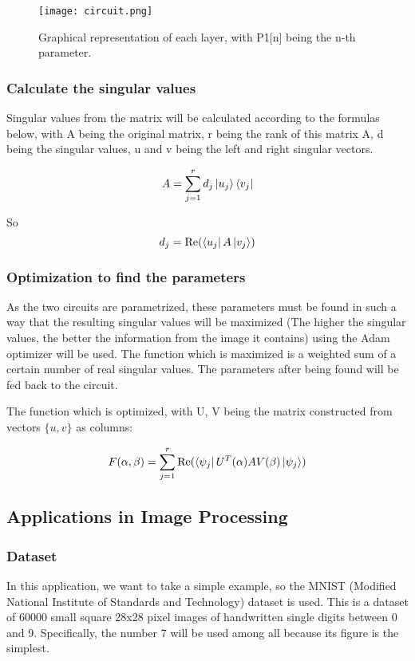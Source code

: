 \documentclass{article}
\begin{document}
\begin{figure}
\centering
\texttt{[image: circuit.png]}
\caption{Graphical representation of each layer, with P1[n] being the n-th parameter.}
\end{figure}



\subsubsection{Calculate the singular values}
Singular values from the matrix will be calculated according to the formulas below, with A being the original matrix, r being the rank of this matrix A, d being the singular values, u and v being the left and right singular vectors.

\begin{equation}
    A = \sum_{j=1}^{r} d_{j}\ket{u_{j}} \bra{v_{j}}
\end{equation}

So
\begin{equation}
    d_{j}= \text{Re}(\bra{u_{j}}A\ket{v_{j}})
\end{equation}


\subsubsection{Optimization to find the parameters}
As the two circuits are parametrized, these parameters must be found in such a way that the resulting singular values will be maximized (The higher the singular values, the better the information from the image it contains) using the Adam optimizer will be used. The function which is maximized is a weighted sum of a certain number of real singular values. 
The parameters after being found will be fed back to the circuit. 

The function which is optimized, with U, V being the matrix constructed from vectors $\{u,v\}$ as columns:

\begin{equation}
    F(\alpha,\beta)= \sum_{j=1}^{r} \text{Re}( \bra{\psi_{j}}U^T (\alpha) A V(\beta)\ket{\psi_{j}})
\end{equation}



\subsection{Applications in Image Processing}
\subsubsection{Dataset}
In this application, we want to take a simple example, so the MNIST (Modified National Institute of Standards and Technology) dataset is used. This is a dataset of 60000 small square 28x28 pixel images of handwritten single digits between 0 and 9. Specifically, the number 7 will be used among all because its figure is the simplest.
\end{document}
